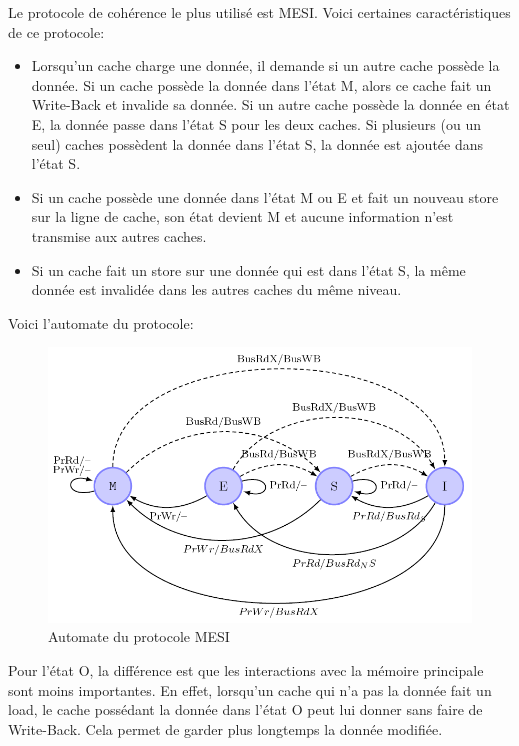\documentclass[a4paper]{article}
\begin{document}
\newpage
\indent Le protocole de cohérence le plus utilisé est MESI. Voici certaines caractéristiques de ce protocole: \\
\begin{itemize}
\item Lorsqu'un cache charge une donnée, il demande si un autre cache possède la donnée. Si un cache possède la donnée dans l'état M, alors ce cache fait un Write-Back et invalide sa donnée. Si un autre cache possède la donnée en état E, la donnée passe dans l'état S pour les deux caches. Si plusieurs (ou un seul) caches possèdent la donnée dans l'état S, la donnée est ajoutée dans l'état S.
\item Si un cache possède une donnée dans l'état M ou E et fait un nouveau store sur la ligne de cache, son état devient M et aucune information n'est transmise aux autres caches.
\item Si un cache fait un store sur une donnée qui est dans l'état S, la même donnée est invalidée dans les autres caches du même niveau. \\
\end{itemize}

\indent Voici l'automate du protocole: \\

\begin{figure}[!h]
\begin{center}
   \includegraphics[scale=0.45]{mesi.png}
   \caption{\label{mesi} Automate du protocole MESI}
\end{center}
\end{figure}

\indent Pour l'état O, la différence est que les interactions avec la mémoire principale sont moins importantes. En effet, lorsqu'un cache qui n'a pas la donnée fait un load, le cache possédant la donnée dans l'état O peut lui donner sans faire de Write-Back. Cela permet de garder plus longtemps la donnée modifiée.
\end{document}
